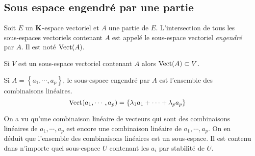 \subsection{Sous espace engendré par une partie}
\begin{defi}
 Soit $E$ un $\mathbf{K}$-espace vectoriel et $A$ une partie de $E$. L'intersection de tous les sous-espaces vectoriels contenant $A$ est appelé le sous-espace vectoriel \emph{engendré} par $A$. Il est noté $\mathop{\mathrm{Vect}}(A)$.
\end{defi}
\begin{rem}
  Si $V$ est un sous-espace vectoriel contenant $A$ alors $\mathop{\mathrm{Vect}}(A)\subset V$.
\end{rem}

\begin{prop}
 Si $A=\left\lbrace a_1,\cdots,a_p\right\rbrace$, le sous-espace engendré par $A$ est l'ensemble des combinaisons linéaires.
\begin{displaymath}
 \mathop{\mathrm{Vect}}(a_1,\cdots,a_p)=
\left\lbrace
\lambda_1 a_1 + \cdots + \lambda_p a_p
 \right\rbrace 
\end{displaymath}
\end{prop}
\begin{demo}
 On a vu qu'une combinaison linéaire de vecteurs qui sont des combinaisons linéaires de $a_1,\cdots,a_p$ est encore une combinaison linéaire de $a_1,\cdots,a_p$. On en déduit que l'ensemble des combinaisons linéaires est un sous-espace. Il est contenu dans n'importe quel sous-espace $U$ contenant les $a_i$ par stabilité de $U$.
\end{demo}

